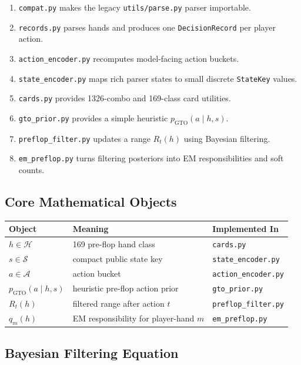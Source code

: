 \documentclass[11pt]{article}
\newcommand{\Hcal}{\mathcal{H}}
\newcommand{\Scal}{\mathcal{S}}
\newcommand{\Acal}{\mathcal{A}}
\begin{document}
\begin{enumerate}[leftmargin=*]
  \item \texttt{compat.py} makes the legacy \texttt{utils/parse.py} parser importable.
  \item \texttt{records.py} parses hands and produces one \texttt{DecisionRecord}
  per player action.
  \item \texttt{action\_encoder.py} recomputes model-facing action buckets.
  \item \texttt{state\_encoder.py} maps rich parser states to small discrete
  \texttt{StateKey} values.
  \item \texttt{cards.py} provides 1326-combo and 169-class card utilities.
  \item \texttt{gto\_prior.py} provides a simple heuristic
  \(p_{\mathrm{GTO}}(a \mid h,s)\).
  \item \texttt{preflop\_filter.py} updates a range
  \(R_t(h)\) using Bayesian filtering.
  \item \texttt{em\_preflop.py} turns filtering posteriors into EM
  responsibilities and soft counts.
\end{enumerate}

\subsection{Core Mathematical Objects}

\begin{center}
\begin{tabular}{lll}
\toprule
\textbf{Object} & \textbf{Meaning} & \textbf{Implemented In} \\
\midrule
\(h \in \Hcal\) & 169 pre-flop hand class & \texttt{cards.py} \\
\(s \in \Scal\) & compact public state key & \texttt{state\_encoder.py} \\
\(a \in \Acal\) & action bucket & \texttt{action\_encoder.py} \\
\(p_{\mathrm{GTO}}(a\mid h,s)\) & heuristic pre-flop action prior & \texttt{gto\_prior.py} \\
\(R_t(h)\) & filtered range after action \(t\) & \texttt{preflop\_filter.py} \\
\(q_m(h)\) & EM responsibility for player-hand \(m\) & \texttt{em\_preflop.py} \\
\bottomrule
\end{tabular}
\end{center}

\subsection{Bayesian Filtering Equation}
\end{document}
